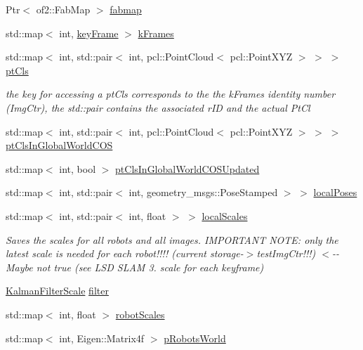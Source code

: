 \begin{DoxyCompactItemize}
\item 
\-Ptr$<$ of2\-::\-Fab\-Map $>$ \hyperlink{classCentralStorage_a4172d4d2a8509cb0bfbdb4edc8a3707b}{fabmap}
\item 
std\-::map$<$ int, \hyperlink{structkeyFrame}{key\-Frame} $>$ \hyperlink{classCentralStorage_ab477c78726c58cba1b5b14255700ff64}{k\-Frames}
\item 
std\-::map$<$ int, std\-::pair$<$ int, \*
pcl\-::\-Point\-Cloud$<$ pcl\-::\-Point\-X\-Y\-Z $>$ $>$ $>$ \hyperlink{classCentralStorage_a98df05b89e7956601eeff266fbef0754}{pt\-Cls}
\begin{DoxyCompactList}\small\item\em the key for accessing a pt\-Cls corresponds to the the k\-Frames identity number (\-Img\-Ctr), the std\-::pair contains the associated r\-I\-D and the actual \-Pt\-Cl \end{DoxyCompactList}\item 
std\-::map$<$ int, std\-::pair$<$ int, \*
pcl\-::\-Point\-Cloud$<$ pcl\-::\-Point\-X\-Y\-Z $>$ $>$ $>$ \hyperlink{classCentralStorage_ac162077a92cd58a58d19ae7404719490}{pt\-Cls\-In\-Global\-World\-C\-O\-S}
\item 
std\-::map$<$ int, bool $>$ \hyperlink{classCentralStorage_a6b25259119c01d07da15d4e5c9f806f8}{pt\-Cls\-In\-Global\-World\-C\-O\-S\-Updated}
\item 
std\-::map$<$ int, std\-::pair$<$ int, \*
geometry\-\_\-msgs\-::\-Pose\-Stamped $>$ $>$ \hyperlink{classCentralStorage_a9f86101c4abfa538b14ecafbbffb49e8}{local\-Poses}
\item 
std\-::map$<$ int, std\-::pair$<$ int, \*
float $>$ $>$ \hyperlink{classCentralStorage_a77f707a32dbf4d3b76668d2bdb2db060}{local\-Scales}
\begin{DoxyCompactList}\small\item\em \-Saves the scales for all robots and all images. \-I\-M\-P\-O\-R\-T\-A\-N\-T \-N\-O\-T\-E\-: only the latest scale is needed for each robot!!!! (current storage-\/$>$test\-Img\-Ctr!!!) $<$-\/-\/ \-Maybe not true (see \-L\-S\-D \-S\-L\-A\-M 3. scale for each keyframe) \end{DoxyCompactList}\item 
\hyperlink{classKalmanFilterScale}{\-Kalman\-Filter\-Scale} \hyperlink{classCentralStorage_af952071a5b552f94e01d8667227bfa57}{filter}
\item 
std\-::map$<$ int, float $>$ \hyperlink{classCentralStorage_a017fa3b55ed277d63df2a0937be0ead7}{robot\-Scales}
\item 
std\-::map$<$ int, \-Eigen\-::\-Matrix4f $>$ \hyperlink{classCentralStorage_ae701316885fe7f1366f17ec44393b84b}{p\-Robots\-World}

\end{DoxyCompactItemize}
